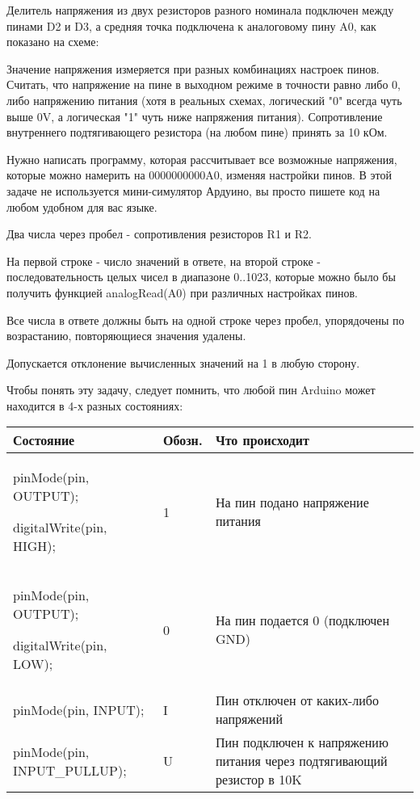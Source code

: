 
Делитель напряжения из двух резисторов разного номинала подключен между пинами D2 и D3, а средняя точка подключена к аналоговому пину A0, как показано на схеме:


Значение напряжения измеряется при разных комбинациях настроек пинов. Считать, что напряжение на пине в выходном режиме в точности равно либо 0, либо напряжению питания (хотя в реальных схемах, логический "0" всегда чуть выше 0V, а логическая "1" чуть ниже напряжения питания). Сопротивление внутреннего подтягивающего резистора (на любом пине) принять за 10 кОм.  

Нужно написать программу, которая рассчитывает все возможные напряжения, которые можно намерить на 0000000000A0, изменяя настройки пинов.  В этой задаче не используется мини-симулятор Ардуино, вы просто пишете код на любом удобном для вас языке.

Два числа через пробел - сопротивления резисторов R1 и R2.

\outputfmtSection
На первой строке - число значений в ответе, на второй строке - последовательность целых чисел в диапазоне 0..1023, 
которые можно было бы получить функцией analogRead(A0) при различных настройках пинов.  

Все числа в ответе должны быть  на одной строке через пробел,  упорядочены по возрастанию,  
повторяющиеся значения удалены. 

Допускается отклонение вычисленных значений на 1 в любую сторону.

\solutionSection

Чтобы понять эту задачу, следует помнить, что любой пин Arduino может находится в 4-х разных состояниях:

\begin{tabular}{|p{6.5cm}|p{1.5cm}|p{6cm}|}
    \hline
    Состояние&Обозн.&Что происходит \\
    \hline
    pinMode(pin, OUTPUT);

    digitalWrite(pin,  HIGH);& 1& На пин подано напряжение питания\\
    \hline
    pinMode(pin, OUTPUT);

    digitalWrite(pin,  LOW); & 0 & На пин подается 0 (подключен GND) \\
    \hline
    pinMode(pin, INPUT); &I &Пин отключен от каких-либо напряжений \\
    \hline
    pinMode(pin, INPUT\_PULLUP);& U & Пин подключен к напряжению питания через подтягивающий резистор в 10K \\
    \hline
\end{tabular}
 
